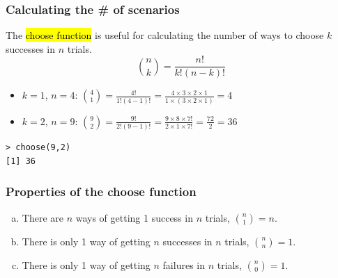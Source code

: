 
\begin{frame}[fragile]
\frametitle{Calculating the \# of scenarios}

{
The \hl{choose function} is useful for calculating the number of ways to choose $k$ successes in $n$ trials.
\[ {n \choose k} = \frac{n!}{k! (n - k)!} \]
}

\pause

\begin{itemize}

\item $k = 1$, $n = 4$: ${4 \choose 1} = \frac{4!}{1! (4 - 1)!} = \frac{4 \times 3 \times 2 \times 1}{1 \times (3 \times 2 \times 1)} = 4$

\pause

\item $k = 2$, $n = 9$: ${9 \choose 2} = \frac{9!}{2! (9 - 1)!} = \frac{9 \times 8 \times 7!}{2 \times 1 \times 7!} = \frac{72}{2} = 36$

\end{itemize}

\vfill

\begin{beamerboxesrounded}[shadow = true, lower = code body]{}
{\small
\begin{verbatim}
> choose(9,2)
[1] 36
\end{verbatim}
}
\end{beamerboxesrounded}

\end{frame}


\begin{frame}[fragile]
\frametitle{Properties of the choose function}


\begin{enumerate}[(a)]
\item There are $n$ ways of getting 1 success in $n$ trials, ${n \choose 1} = n$.
\item There is only 1 way of getting $n$ successes in $n$ trials, ${n \choose n} = 1$.
\item There is only 1 way of getting $n$ failures in $n$ trials, ${n \choose 0} = 1$.
\end{enumerate}

\end{frame}

